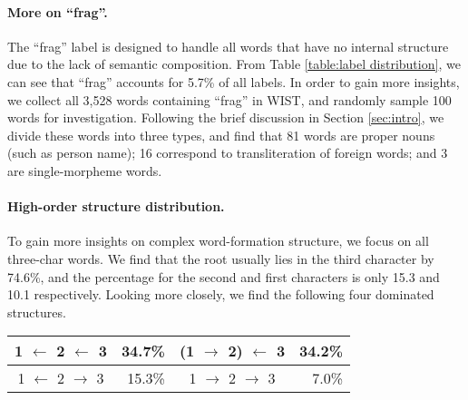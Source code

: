 


\paragraph{More on ``frag''.} 
The ``frag'' label is designed to handle all words that have no internal structure due to the lack of semantic composition. 
From Table \ref{table:label distribution}, we can see that ``frag'' accounts for 5.7\% of all labels. 
In order to gain more insights, we collect all 3,528 words containing ``frag'' in WIST, and randomly sample 100 words for investigation. 
Following the brief discussion in Section \ref{sec:intro}, we divide these words into three types, and find that 81 words are proper nouns (such as person name); 16 correspond to transliteration of foreign words; and 3 are single-morpheme words. 

\paragraph{High-order structure distribution.} 
To gain more insights on complex word-formation structure, we focus on all three-char words. 
We find that the root usually lies in the third character by 74.6\%, and the percentage for the second and first characters is only 15.3 and 10.1 respectively. Looking more closely, we find the following four dominated structures. 

\setlength{\tabcolsep}{6pt}
\begin{center}
\newcommand{\tabincell}[2]{\begin{tabular}{@{}#1@{}}#2\end{tabular}}
\begin{tabular}{c r | c r }
    1 $\leftarrow$ 2 $\leftarrow$ 3 & 34.7\% &  
(1 $\rightarrow$ 2) $\leftarrow$ 3 & 34.2\% \\
\hline
1 $\leftarrow$ 2 $\rightarrow$ 3 & 15.3\% &  
1 $\rightarrow$ 2 $\rightarrow$ 3 & 7.0\% \\
\end{tabular}
\end{center}

